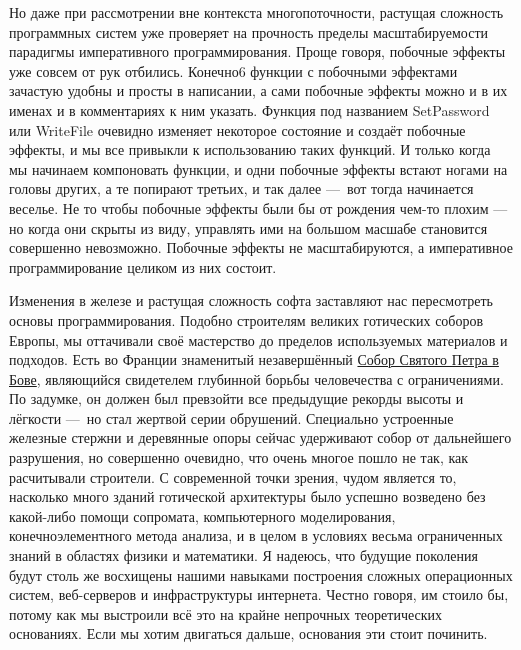 Но даже при рассмотрении вне контекста многопоточности, растущая сложность программных систем уже
проверяет на прочность пределы масштабируемости парадигмы императивного программирования. Проще говоря,
побочные эффекты уже совсем от рук отбились. Конечно6 функции с побочными эффектами зачастую
удобны и просты в написании, а сами побочные эффекты можно и в их именах и в комментариях к ним указать.
Функция под названием SetPassword или WriteFile очевидно изменяет некоторое состояние и создаёт побочные эффекты,
и мы все привыкли к использованию таких функций. И только когда мы начинаем компоновать функции, и одни побочные эффекты
встают ногами на головы других, а те попирают третьих, и так далее — вот тогда начинается веселье. Не то чтобы побочные
эффекты были бы от рождения чем-то плохим --- но когда они скрыты из виду, управлять ими на большом масшабе становится
совершенно невозможно. Побочные эффекты не масштабируются, а императивное программирование целиком из них состоит.

Изменения в железе и растущая сложность софта заставляют нас пересмотреть основы программирования.
Подобно строителям великих готических соборов Европы, мы оттачивали своё мастерство до пределов
используемых материалов и подходов. Есть во Франции знаменитый незавершённый
\href{https://www.wikiwand.com/ru/Собор_Святого_Петра_(Бове)}{Собор Святого Петра в Бове},
являющийся свидетелем глубинной борьбы человечества с ограничениями. По задумке, он должен был
превзойти все предыдущие рекорды высоты и лёгкости — но стал жертвой серии обрушений.
Специально устроенные железные стержни и деревянные опоры сейчас удерживают собор от дальнейшего разрушения,
но совершенно очевидно, что очень многое пошло не так, как расчитывали строители. С современной точки зрения,
чудом является то, насколько много зданий готической архитектуры было успешно возведено без какой-либо помощи
сопромата, компьютерного моделирования, конечноэлементного метода анализа, и в целом в условиях весьма
ограниченных знаний в областях физики и математики. Я надеюсь, что будущие поколения будут столь же восхищены
нашими навыками построения сложных операционных систем, веб-серверов и инфраструктуры интернета. Честно говоря,
им стоило бы, потому как мы выстроили всё это на крайне непрочных теоретических основаниях.
Если мы хотим двигаться дальше, основания эти стоит починить.


